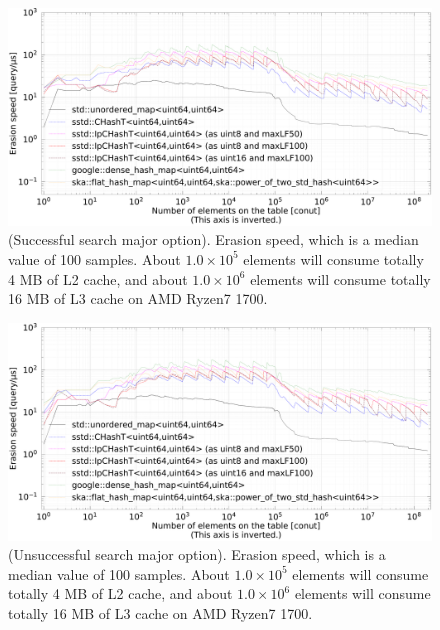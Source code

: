 \begin{figure}[h]
  \hspace{-3mm}
  \includegraphics[scale=0.24]{./fig_bench_sm/erase_med.pdf}
  \caption{
    (Successful search major option). Erasion speed, which is a median value of 100 samples.
    About $1.0\times10^5$ elements will consume totally 4 MB of L2 cache,
    and about $1.0\times10^6$ elements will consume totally 16 MB of L3 cache on AMD Ryzen7 1700.
  }
  \label{fig_bench_erase_sm}
\end{figure}

\begin{figure}[h]
  \hspace{-3mm}
  \includegraphics[scale=0.24]{./fig_bench_usm/erase_med.pdf}
  \caption{
    (Unsuccessful search major option). Erasion speed, which is a median value of 100 samples.
    About $1.0\times10^5$ elements will consume totally 4 MB of L2 cache,
    and about $1.0\times10^6$ elements will consume totally 16 MB of L3 cache on AMD Ryzen7 1700.
  }
  \label{fig_bench_erase_um}
\end{figure}

















